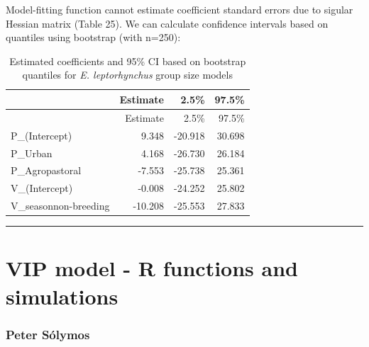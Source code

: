 \documentclass[]{article}
\begin{document}
Model-fitting function cannot estimate coefficient standard errors due
to sigular Hessian matrix (Table 25). We can calculate confidence
intervals based on quantiles using bootstrap (with n=250):

\begin{longtable}[]{@{}lrrr@{}}
\caption{Estimated coefficients and 95\% CI based on bootstrap quantiles
for \textit{E. leptorhynchus} group size models}\tabularnewline
\toprule
& Estimate & 2.5\% & 97.5\%\tabularnewline
\midrule
\endfirsthead
\toprule
& Estimate & 2.5\% & 97.5\%\tabularnewline
\midrule
\endhead
P\_(Intercept) & 9.348 & -20.918 & 30.698\tabularnewline
P\_Urban & 4.168 & -26.730 & 26.184\tabularnewline
P\_Agropastoral & -7.553 & -25.738 & 25.361\tabularnewline
V\_(Intercept) & -0.008 & -24.252 & 25.802\tabularnewline
V\_seasonnon-breeding & -10.208 & -25.553 & 27.833\tabularnewline
\bottomrule
\end{longtable}

\begin{center}\rule{0.5\linewidth}{\linethickness}\end{center}

\section{VIP model - R functions and
simulations}\label{vip-model---r-functions-and-simulations}

\subsubsection{Peter Sólymos}\label{peter-solymos}
\end{document}
